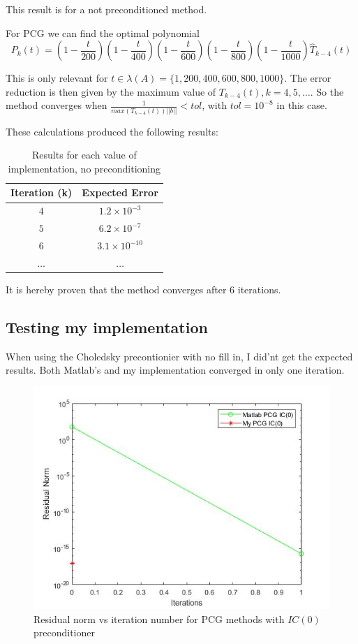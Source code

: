 \documentclass[a4paper, 11pt]{article}
\begin{document}
			This result is for a not preconditioned method.
			
			For PCG we can find the optimal polynomial
			\begin{equation}
				P_k(t) = (1-\frac{t}{200})(1-\frac{t}{400})(1-\frac{t}{600})(1-\frac{t}{800})(1-\frac{t}{1000})\hat{T}_{k-4}(t)
			\end{equation}
		
			This is only relevant for $t \in \lambda(A) = \{1,200,400,600,800,1000\}$.
			The error reduction is then given by the maximum value of $ T_{k-4}(t), k=4,5,\ldots $.
			So the method converges when $\frac{1}{max(T_{k-4}(t))||b||} < tol$, with $tol = 10^{-8}$ in this case.
			
			These calculations produced the following results:
			\begin{table}[H]
				\centering
				\begin{tabular}{c|c}
					\textbf{Iteration (k)} 	& \textbf{Expected Error} \\ \hline
					$4$ 					& $ 1.2 \times 10^{-3} $ 	\\ \hline	
					$5$						& $ 6.2 \times 10^{-7} $	\\ \hline
					$6$						& $ 3.1 \times 10^{-10} $	\\	\hline
					$\ldots$				& $ \ldots $	\\
				\end{tabular}
				\caption{Results for each value of implementation, no preconditioning}
				\label{table:ex3_theory}
			\end{table}
		
			It is hereby proven that the method converges after 6 iterations.		
			
			\subsection*{Testing my implementation}
			When using the Choledsky precontionier with no fill in, I did'nt get the expected results.
			Both Matlab's and my implementation converged in only one iteration.
			
			\begin{figure}[H]
				\centering
				\includegraphics[width=.6\linewidth]{ex3.jpg}
				\caption{Residual norm vs iteration number for PCG methods with $IC(0)$ preconditioner}
				\label{fig:ex3}
			\end{figure}
		
\end{document}
